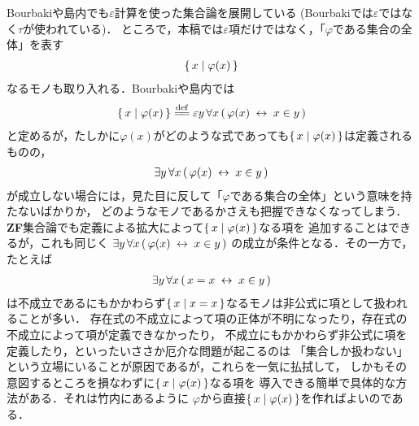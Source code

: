 	Bourbaki\cite{Bourbaki}や島内\cite{Shimauchi}でも$\varepsilon$計算を使った集合論を展開している
	(Bourbaki\cite{Bourbaki}では$\varepsilon$ではなく$\tau$が使われている)．
	ところで，本稿では$\varepsilon$項だけではなく，「$\varphi$である集合の全体」を表す
	\begin{align}
		\{\, x \mid \varphi(x)\, \}
	\end{align}
	なるモノも取り入れる．Bourbaki\cite{Bourbaki}や島内\cite{Shimauchi}では
	\begin{align}
		\Set{x}{\varphi(x)} \defeq \varepsilon y\, \forall x\, 
		(\, \varphi(x) \lrarrow x \in y\, )
	\end{align}
	と定めるが，たしかに$\varphi(x)$がどのような式であっても$\{\, x \mid \varphi(x)\, \}$は定義されるものの，
	\begin{align}
		\exists y\, \forall x\, (\, \varphi(x) \hspace{0.25em}\leftrightarrow\hspace{0.25em} x \in y\, )
	\end{align}
	が成立しない場合には，見た目に反して「$\varphi$である集合の全体」という意味を持たないばかりか，
	どのようなモノであるかさえも把握できなくなってしまう．
	{\bf ZF}集合論でも定義による拡大によって$\{\, x \mid \varphi(x)\, \}$なる項を
	追加することはできるが，これも同じく
	$\exists y\, \forall x\, (\, \varphi(x) \hspace{0.25em}\leftrightarrow\hspace{0.25em} x \in y\, )$
	の成立が条件となる．その一方で，たとえば%
	\begin{align}
		\exists y\, \forall x\, (\, x = x \hspace{0.25em}\leftrightarrow\hspace{0.25em} x \in y\, )
	\end{align}
	は不成立であるにもかかわらず$\{\, x \mid x = x\, \}$なるモノは非公式に項として扱われることが多い．
	存在式の不成立によって項の正体が不明になったり，存在式の不成立によって項が定義できなかったり，
	不成立にもかかわらず非公式に項を定義したり，といったいささか厄介な問題が起こるのは
	「集合しか扱わない」という立場にいることが原因であるが，これらを一気に払拭して，
	しかもその意図するところを損なわずに$\{\, x \mid \varphi(x)\, \}$なる項を
	導入できる簡単で具体的な方法がある．それは竹内\cite{TakeuchiSet}にあるように
	$\varphi$から直接$\{\, x \mid \varphi(x)\, \}$を作ればよいのである．
	
